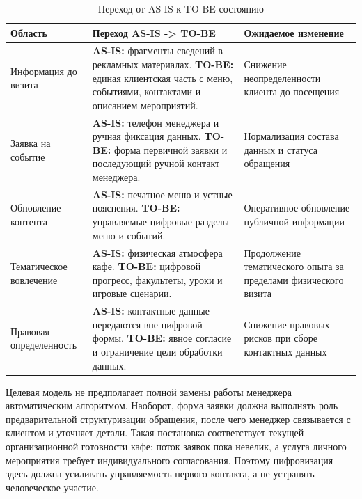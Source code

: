 \begin{table}[H]
\centering
\small
\caption{Переход от AS-IS к TO-BE состоянию}
\label{tab:v2_asis_tobe_transition}
\begin{tabularx}{\textwidth}{|>{\raggedright\arraybackslash}p{}|>{\raggedright\arraybackslash}p{}|>{\raggedright\arraybackslash}X|}
\hline
\textbf{Область} & \textbf{Переход AS-IS -> TO-BE} & \textbf{Ожидаемое изменение} \\ \hline
Информация до визита & \textbf{AS-IS:} фрагменты сведений в рекламных материалах. \newline \textbf{TO-BE:} единая клиентская часть с меню, событиями, контактами и описанием мероприятий. & Снижение неопределенности клиента до посещения \\ \hline
Заявка на событие & \textbf{AS-IS:} телефон менеджера и ручная фиксация данных. \newline \textbf{TO-BE:} форма первичной заявки и последующий ручной контакт менеджера. & Нормализация состава данных и статуса обращения \\ \hline
Обновление контента & \textbf{AS-IS:} печатное меню и устные пояснения. \newline \textbf{TO-BE:} управляемые цифровые разделы меню и событий. & Оперативное обновление публичной информации \\ \hline
Тематическое вовлечение & \textbf{AS-IS:} физическая атмосфера кафе. \newline \textbf{TO-BE:} цифровой прогресс, факультеты, уроки и игровые сценарии. & Продолжение тематического опыта за пределами физического визита \\ \hline
Правовая определенность & \textbf{AS-IS:} контактные данные передаются вне цифровой формы. \newline \textbf{TO-BE:} явное согласие и ограничение цели обработки данных. & Снижение правовых рисков при сборе контактных данных \\ \hline
\end{tabularx}
\normalsize
\end{table}

Целевая модель не предполагает полной замены работы менеджера автоматическим алгоритмом. Наоборот, форма заявки должна выполнять роль предварительной структуризации обращения, после чего менеджер связывается с клиентом и уточняет детали. Такая постановка соответствует текущей организационной готовности кафе: поток заявок пока невелик, а услуга личного мероприятия требует индивидуального согласования. Поэтому цифровизация здесь должна усиливать управляемость первого контакта, а не устранять человеческое участие.

